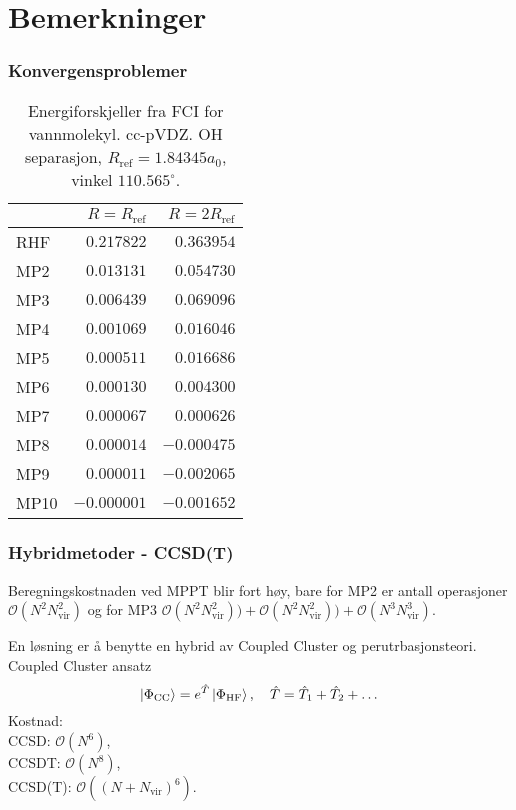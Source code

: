 \documentclass{beamer}
\begin{document}
\section{Bemerkninger}

\begin{frame}
	\frametitle{Konvergensproblemer}
	
	\begin{table}
		\begin{tabular}{l r r} \hline
			& $R = R_{\text{ref}}$ & $R = 2R_{\text{ref}}$ \\ \hline
			RHF & $0.217822$  & $0.363954$ \\
			MP2 & $0.013131$  & $0.054730$ \\
			MP3 & $0.006439$& $0.069096$ \\
			MP4 & $0.001069$& $0.016046$ \\
			MP5 & $0.000511$ & $0.016686$ \\
			MP6 & $0.000130$ & $0.004300$ \\
			MP7 & $0.000067$ & $0.000626$ \\
			MP8 & $0.000014$ & $-0.000475$ \\
			MP9 & $0.000011$ & $-0.002065$ \\
			MP10&$-0.000001$&$-0.001652$ \\ \hline
		\end{tabular}
		\caption{Energiforskjeller fra FCI for vannmolekyl. cc-pVDZ. OH separasjon, $R_\text{ref}=1.843
		45a_0$, vinkel $110.565^\circ$.}
	\end{table}
	
\end{frame}

\begin{frame}
	\frametitle{Hybridmetoder - CCSD(T)}
	
		Beregningskostnaden ved MPPT blir fort høy, bare for MP2 er antall operasjoner $\mathcal{O}(N^2N_\text{vir}^2)$ og for MP3 $\mathcal{O}(N^2N_\text{vir}^2)) + \mathcal{O}(N^2N_\text{vir}^2)) + \mathcal{O}(N^3N_\text{vir}^3)$.
	
	En løsning er å benytte en hybrid av Coupled Cluster og perutrbasjonsteori. Coupled Cluster ansatz
	\begin{equation}
		\ket{\Phi_\text{CC}} = e^{\hat T}\ket{\Phi_\text{HF}}, \quad \hat T = \hat T_1 + \hat T_2 + \dots
	\end{equation}
	Kostnad: 
	\\CCSD:  $\mathcal{O}(N^6)$, \\ CCSDT: $\mathcal{O}(N^8)$, \\ CCSD(T): $\mathcal{O}((N + N_\text{vir})^6)$.
	
	
\end{frame}
\end{document}
